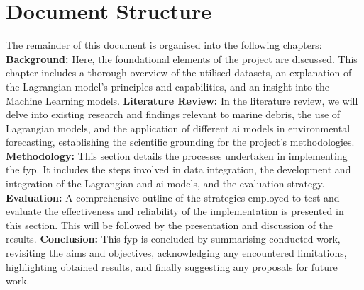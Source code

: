 \section{Document Structure}
\label{sec:document_structure}
The remainder of this document is organised into the following chapters:\newline\newline
\textbf{Background:} Here, the foundational elements of the project are discussed. This chapter includes a thorough overview of the utilised datasets, an explanation of the Lagrangian model's principles and capabilities, and an insight into the Machine Learning models.\newline\newline
\textbf{Literature Review:} In the literature review, we will delve into existing research and findings relevant to marine debris, the use of Lagrangian models, and the application of different \acrshort{ai} models in environmental forecasting, establishing the scientific grounding for the project’s methodologies. \newline\newline
\textbf{Methodology:} This section details the processes undertaken in implementing the \acrshort{fyp}. It includes the steps involved in data integration, the development and integration of the Lagrangian and \acrshort{ai} models, and the evaluation strategy.\newline\newline
\textbf{Evaluation:} A comprehensive outline of the strategies employed to test and evaluate the effectiveness and reliability of the implementation is presented in this section. This will be followed by the presentation and discussion of the results.\newline\newline
\textbf{Conclusion:} This \acrshort{fyp} is concluded by summarising conducted work, revisiting the aims and objectives, acknowledging any encountered limitations, highlighting obtained results, and finally suggesting any proposals for future work.